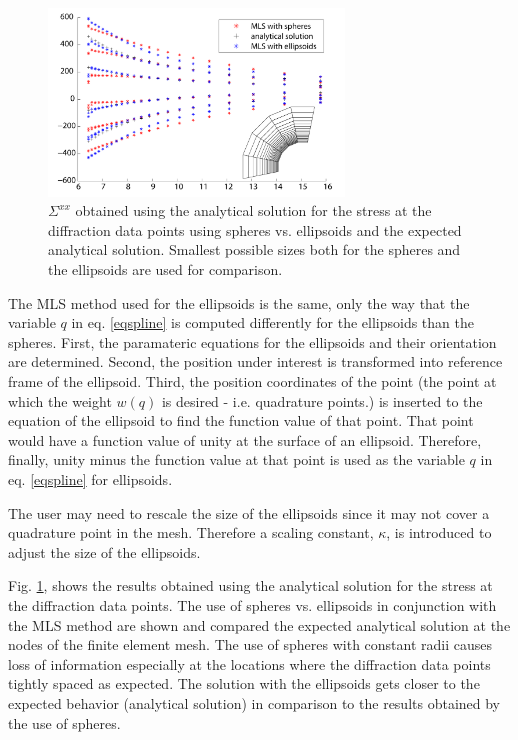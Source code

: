 \documentclass{article}
\begin{document}
\begin{figure}[!ht]
    \centering
            \includegraphics[width=0.7\textwidth]{sphvsel.pdf}
    \caption{$\Sigma^{xx}$ obtained using the analytical solution for the stress at the diffraction data points using spheres vs. ellipsoids and the expected analytical solution. Smallest possible sizes both for the spheres and the ellipsoids are used for comparison.}
    \label{sphvsel}
\end{figure}

The MLS method used for the ellipsoids is the same, only the way that the variable $q$ in eq. \eqref{eqspline} is computed differently for the ellipsoids than the spheres. First, the paramateric equations for the ellipsoids and their orientation are determined. Second, the position under interest is transformed into reference frame of the ellipsoid. Third, the position coordinates of the point (the point at which the weight $w(q)$ is desired - i.e. quadrature points.) is inserted to the equation of the ellipsoid to find the function value of that point. That point would have a function value of unity at the surface of an ellipsoid. Therefore, finally, unity minus the function value at that point is used as the variable $q$ in eq. \eqref{eqspline} for ellipsoids.

The user may need to rescale the size of the ellipsoids since it may not cover a quadrature point in the mesh. Therefore a scaling constant, $\kappa$, is introduced to adjust the size of the ellipsoids.

Fig. \ref{sphvsel}, shows the results obtained using the analytical solution for the stress at the diffraction data points. The use of spheres vs. ellipsoids in conjunction with the MLS method are shown and compared the expected analytical solution at the nodes of the finite element mesh. The use of spheres with constant radii causes loss of information especially at the locations where the diffraction data points tightly spaced as expected. The solution with the ellipsoids gets closer to the expected behavior (analytical solution) in comparison to the results obtained by the use of spheres.
\end{document}
